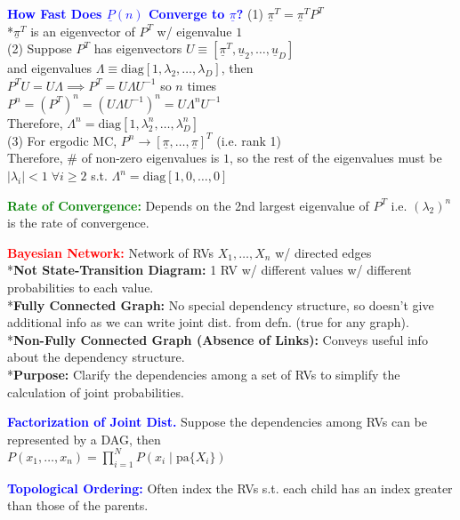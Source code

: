 \documentclass[5pt]{extarticle} %
\begin{document}
\begin{paracol}{3}
{    \textcolor{blue}{\textbf{How Fast Does $\underline{P}(n)$ Converge to $\underline{\pi}$?}} (1) $\underline{\pi}^T = \underline{\pi}^T P^T$ \\
    *$\underline{\pi}^T$ is an eigenvector of $P^T$ w/ eigenvalue $1$ \\
    (2) Suppose $P^T$ has eigenvectors $U \equiv [\underline{\pi}^T, \underline{u}_2, \ldots, \underline{u}_D]$ \\ 
    and eigenvalues $\Lambda \equiv \text{diag}[1, \lambda_2, \ldots, \lambda_D]$, then \\
    $P^T U = U \Lambda \implies P^T = U \Lambda U^{-1}$ so $n$ times \\
    $P^n = (P^T)^n = (U \Lambda U^{-1})^n = U \Lambda^n U^{-1}$ \\
    Therefore, $\Lambda^n = \text{diag}[1, \lambda_2^n, \ldots, \lambda_D^n]$ \\
    (3) For ergodic MC, $P^n \rightarrow [\underline{\pi}, \ldots, \underline{\pi}]^T$ (i.e. rank 1) \\
    Therefore, \# of non-zero eigenvalues is $1$, so the rest of the eigenvalues must be $|\lambda_i| < 1 \; \forall i \geq 2$ s.t. $\Lambda^n = \text{diag}[1,0,\ldots,0]$

    \textcolor{green}{\textbf{Rate of Convergence:}} Depends on the 2nd largest eigenvalue of $P^T$ i.e. $(\lambda_2)^n$ is the rate of convergence.

    \textcolor{red}{\textbf{Bayesian Network:}} Network of RVs $X_1,\ldots,X_n$ w/ directed edges \\ 
    *\textbf{Not State-Transition Diagram:} 1 RV w/ different values w/ different probabilities to each value. \\
    *\textbf{Fully Connected Graph:} No special dependency structure, so doesn't give additional info as we can write joint dist. from defn. (true for any graph). \\
    *\textbf{Non-Fully Connected Graph (Absence of Links):} Conveys useful info about the dependency structure. \\
    *\textbf{Purpose:} Clarify the dependencies among a set of RVs to simplify the calculation of joint probabilities. 

    \textcolor{blue}{\textbf{Factorization of Joint Dist.}} Suppose the dependencies among RVs can be represented by a DAG, then \\
    $P(x_1,\ldots,x_n) = \prod_{i=1}^N P(x_i \mid \text{pa}\{X_i\})$ 

    \textcolor{blue}{\textbf{Topological Ordering:}} Often index the RVs s.t. each child has an index greater than those of the parents. 

}
\end{paracol}
\end{document}

